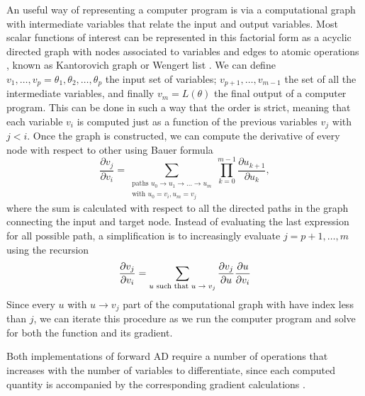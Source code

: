 An useful way of representing a computer program is via a computational graph with intermediate variables that relate the input and output variables. 
Most scalar functions of interest can be represented in this factorial form as a acyclic directed graph with nodes associated to variables and edges to atomic operations \cite{griewank2008evaluatingderivatives, Griewack-on-AD}, known as Kantorovich graph \cite{kantorovich1957mathematical} or Wengert list \cite{Wengert_1964}. 
We can define $v_1, \ldots, v_p = \theta_1, \theta_2, \ldots, \theta_p$ the input set of variables; $v_{p+1}, \ldots, v_{m-1}$ the set of all the intermediate variables, and finally $v_m = L(\theta)$ the final output of a computer program. 
This can be done in such a way that the order is strict, meaning that each variable $v_i$ is computed just as a function of the previous variables $v_j$ with $j < i$. 
Once the graph is constructed, we can compute the derivative of every node with respect to other using Bauer formula \cite{Bauer_1974, Oktay_randomized-AD}
\begin{equation}
    \frac{\partial v_j}{\partial v_i}
    = 
    \sum_{\substack{ \text{paths }u_0 \rightarrow u_1 \rightarrow \ldots \rightarrow u_m \\
                    \text{with } u_0=v_i, u_m = v_j}}
    \prod_{k=0}^{m-1} \frac{\partial u_{k+1}}{\partial u_{k}},
\end{equation}
where the sum is calculated with respect to all the directed paths in the graph connecting the input and target node.
Instead of evaluating the last expression for all possible path, a simplification is to increasingly evaluate $j=p+1, \ldots, m$ using the recursion 
\begin{equation}
    \frac{\partial v_j}{\partial v_i}
    = 
    \sum_\text{$u$\text{ such that} $u \rightarrow v_j$}
    \frac{\partial v_j}{\partial u}
    \frac{\partial u}{\partial v_i} 
\end{equation}
Since every $u$ with $u \rightarrow v_j$ part of the computational graph with have index less than $j$, we can iterate this procedure as we run the computer program and solve for both the function and its gradient. 

Both implementations of forward AD require a number of operations that increases with the number of variables to differentiate, since each computed quantity is accompanied by the corresponding gradient calculations \cite{Griewack-on-AD}. 

